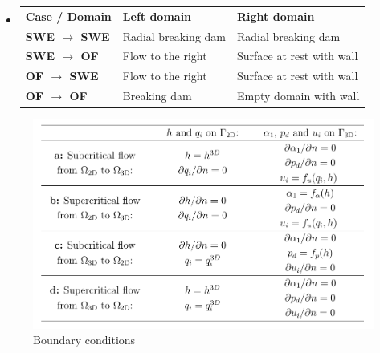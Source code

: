 \begin{frame}
\begin{minipage}{.55\textwidth}
\begin{itemize}
\begin{tcolorbox}[title= \textbf{Supercritical Cases}, colframe=TUMGreen,
colback=TUMGreen!30]
\begin{table}[!h]
\begin{tabular}{lll}
\end{tabular}
\end{table}
\end{tcolorbox}
\item<3->[]
\begin{tcolorbox}[title= \textbf{Subcritical Cases}, colframe=TUMDarkBlue,
colback=TUMDarkBlue!30]
\begin{table}[!h]
\centering
\begin{tabular}{lll}
\textbf{Case / Domain} & \textbf{Left domain} & \textbf{Right domain} \\[0.3cm]
\textbf{SWE $\rightarrow$ SWE} & Radial breaking dam      & Radial breaking dam      \\[0.1cm]
\textbf{SWE $\rightarrow$ OF}  & Flow to the right & Surface at rest with wall        \\ [0.1cm]
\textbf{OF $\rightarrow$ SWE}  & Flow to the right & Surface at rest with wall      \\[0.1cm]
\textbf{OF $\rightarrow$ OF}   & Breaking dam      & Empty domain with wall
\end{tabular}
\end{table}
\end{tcolorbox}

\end{itemize}
\end{minipage}
\end{frame}


\begin{frame}
\begin{figure}
\includegraphics[scale=0.44]{Resources/Images/bcs_mintgen.png}
\caption{Boundary conditions \cite{mintgen}}
\end{figure}
\end{frame}

